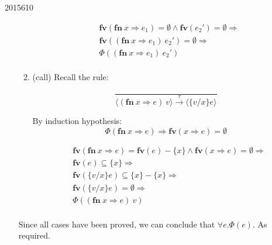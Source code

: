 \documentclass[10pt,\jkfside,a4paper]{article}
\begin{document}
\begin{examquestion}{2015}{6}{10}
\begin{enumerate}[label=(\alph*)]
\begin{enumerate}[label=(\textbf{Case})]
\[
\begin{split}
&\mathbf{fv}(\textbf{fn} \ x \Rightarrow e_1) = \emptyset \wedge \mathbf{fv}
(e_2') = \emptyset  \Longrightarrow \\
&\mathbf{fv}((\textbf{fn} \ x \Rightarrow e_1) \ e_2') = \emptyset
\Longrightarrow \\
&\Phi((\textbf{fn} \ x \Rightarrow e_1) \ e_2') \\
\end{split}
\]

\item (call) Recall the rule:

\[
\dfrac{
}{
\langle (\textbf{fn} \ x \Rightarrow e) \ v \rangle \stackrel{\tau}{\to}
\langle \{v/x\}e \rangle
}
\]

By induction hypothesis:
\[
\Phi(\mathbf{fn} \ x \Rightarrow e)
\Longrightarrow \mathbf{fv}(x \Rightarrow e) = \emptyset
\]

\[
\begin{split}
&\mathbf{fv}(\mathbf{fn} \ x \Rightarrow e) = \mathbf{fv}(e) - \{x\} \wedge
\mathbf{fv}(x \Rightarrow e) = \emptyset \Longrightarrow \\
&\mathbf{fv}(e) \subseteq \{x\} \Longrightarrow \\
&\mathbf{fv}(\{v/x\}e) \subseteq \{x\} - \{x\} \Longrightarrow \\
&\mathbf{fv}(\{v/x\}e) = \emptyset \Longrightarrow \\
&\Phi((\textbf{fn} \ x \Rightarrow e) \ v) \\
\end{split}
\]

\end{enumerate}

Since all cases have been proved, we can conclude that $\forall e. \Phi(e)$.
As required.

\end{enumerate}

\end{examquestion}
\end{document}
